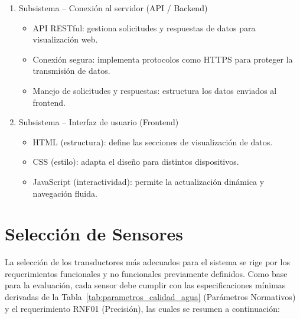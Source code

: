 \begin{enumerate}
    \item Subsistema – Conexión al servidor (API / Backend)
    \begin{itemize}
        \item API RESTful: gestiona solicitudes y respuestas de datos para visualización web.
        \item Conexión segura: implementa protocolos como HTTPS para proteger la transmisión de datos.
        \item Manejo de solicitudes y respuestas: estructura los datos enviados al frontend.
    \end{itemize}

    \item Subsistema – Interfaz de usuario (Frontend)
    \begin{itemize}
        \item HTML (estructura): define las secciones de visualización de datos.
        \item CSS (estilo): adapta el diseño para distintos dispositivos.
        \item JavaScript (interactividad): permite la actualización dinámica y navegación fluida.
    \end{itemize}
\end{enumerate}










\section{Selección de Sensores}
\label{sec:analisis_sensores}
La selección de los transductores más adecuados para el sistema se rige por los requerimientos funcionales y no funcionales previamente definidos. Como base para la evaluación, cada sensor debe cumplir con las especificaciones mínimas derivadas de la Tabla~\ref{tab:parametros_calidad_agua} (Parámetros Normativos) y el requerimiento RNF01 (Precisión), las cuales se resumen a continuación:

